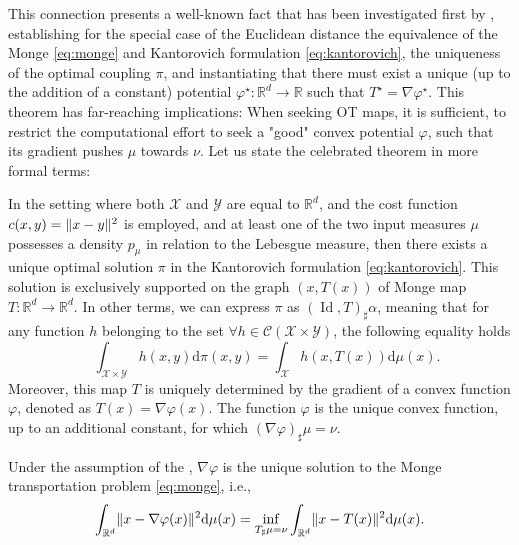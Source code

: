 This connection presents a well-known fact that has been investigated first by \citet{brenier1987decomposition, brenier1991polar}, establishing for the special case of the Euclidean distance the equivalence of the Monge \eqref{eq:monge} and Kantorovich formulation  \eqref{eq:kantorovich}, the uniqueness of the optimal coupling $\pi$, and instantiating that there must exist a unique (up to the addition of a constant) potential $\varphi^\star:\mathbb{R}^d\rightarrow \mathbb{R}$ such that $T^\star = \nabla \varphi^\star$. 
This theorem has far-reaching implications: When seeking \acrlong{OT} maps, it is sufficient, to restrict the computational effort to seek a "good" convex potential $\varphi$, such that its gradient pushes $\mu$ towards $\nu$. 
Let us state the celebrated \citeauthor{brenier1987decomposition} theorem \citeyearpar{brenier1987decomposition} in more formal terms:
\begin{theorem} \label{thm:brenier}
	In the setting where both $\mathcal{X}$ and $\mathcal{Y}$ are equal to $\mathbb{R}^d$, and the cost function $c(x, y) = \lVert x-y\rVert^2$ is employed, and at least one of the two input measures $\mu$ possesses a density $p_\mu$ in relation to the Lebesgue measure, then there exists a unique optimal solution $\pi$ in the Kantorovich formulation \eqref{eq:kantorovich}.
	This solution is exclusively supported on the graph $(x, T(x))$ of Monge map $T: \mathbb{R}^d \rightarrow \mathbb{R}^d$.
	In other terms, we can express $\pi$ as $(\operatorname{Id}, T)_{\sharp} \alpha$, meaning that for any function $h$ belonging to the set $\forall h \in \mathcal{C}(\mathcal{X} \times \mathcal{Y})$, the following equality holds
	$$
	\quad \int_{\mathcal{X} \times \mathcal{Y}} h(x, y) \mathrm{d} \pi(x, y)=\int_{\mathcal{X}} h(x, T(x)) \mathrm{d} \mu(x).
	$$
Moreover, this map $T$ is uniquely determined by the gradient of a convex function $\varphi$, denoted as $T(x)=\nabla \varphi(x)$. The function $\varphi$ is the unique convex function, up to an additional constant, for which $(\nabla \varphi)_{\sharp} \mu=\nu$.
\end{theorem}
\begin{corollary}
	Under the assumption of the , $\nabla \varphi$ is the unique solution to the Monge transportation problem \eqref{eq:monge}, i.e.,
	\begin{equation}
		\int_{\mathbb{R}^d} \lVert x-\nabla \varphi(x)\rVert^2 \mathrm{d}\mu(x) = \inf_{T_\sharp \mu = \nu} \int_{\mathbb{R}^d}\lVert x - T(x)\rVert^2 \mathrm{d}\mu(x).
	\end{equation}
\end{corollary}

